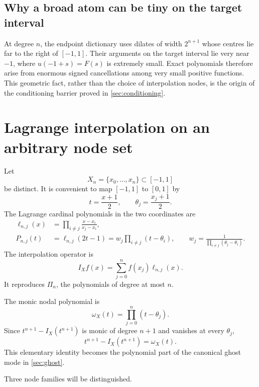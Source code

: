 \documentclass[11pt,oneside]{article}
\theoremstyle{definition}
\theoremstyle{remark}
\newcommand{\1}{\mathbf{1}}
\begin{document}
\subsection{Why a broad atom can be tiny on the target interval}

At degree $n$, the endpoint dictionary uses dilates of width $2^{n+1}$ whose
centres lie far to the right of $[-1,1]$.  Their arguments on the target
interval lie very near $-1$, where $u(-1+s)=F(s)$ is extremely small.  Exact
polynomials therefore arise from enormous signed cancellations among very
small positive functions.  This geometric fact, rather than the choice of
interpolation nodes, is the origin of the conditioning barrier proved in
\cref{sec:conditioning}.

\section{Lagrange interpolation on an arbitrary node set}
\label{sec:lagrange}

Let
\[
 X_n=\{x_0,\ldots,x_n\}\subset[-1,1]
\]
be distinct.  It is convenient to map $[-1,1]$ to $[0,1]$ by
\[
 t=\frac{x+1}{2},\qquad \theta_j=\frac{x_j+1}{2}.
\]
The Lagrange cardinal polynomials in the two coordinates are
\begin{align}
 \ell_{n,j}(x)
 &=\prod_{i\ne j}\frac{x-x_i}{x_j-x_i},\label{eq:ell-x}\\
 P_{n,j}(t)
 &=\ell_{n,j}(2t-1)
 =w_j\prod_{i\ne j}(t-\theta_i),
 \qquad
 w_j=\frac1{\prod_{i\ne j}(\theta_j-\theta_i)}.
 \label{eq:ell-t}
\end{align}
The interpolation operator is
\begin{equation}
 I_Xf(x)=\sum_{j=0}^n f(x_j)\ell_{n,j}(x).
 \label{eq:IX}
\end{equation}
It reproduces $\Pi_n$, the polynomials of degree at most $n$.

The monic nodal polynomial is
\begin{equation}
 \omega_X(t)=\prod_{j=0}^n(t-\theta_j).
 \label{eq:nodal-poly}
\end{equation}
Since $t^{n+1}-I_X(t^{n+1})$ is monic of degree $n+1$ and vanishes at every
$\theta_j$,
\begin{equation}
 t^{n+1}-I_X(t^{n+1})=\omega_X(t).
 \label{eq:monic-remainder}
\end{equation}
This elementary identity becomes the polynomial part of the canonical ghost
mode in \cref{sec:ghost}.

Three node families will be distinguished.
\end{document}
